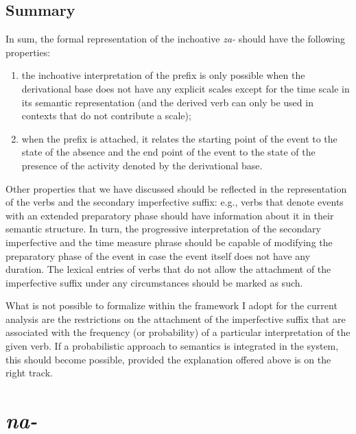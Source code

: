 \subsection{Summary}
In sum, the formal representation of the inchoative \textit{za-} should have the following properties: 
\begin{enumerate}
\item the inchoative interpretation of the prefix is only possible when the derivational base does not have any explicit scales except for the time scale in its semantic representation (and the derived verb can only be used in contexts that do not contribute a scale);
\item when the prefix is attached, it relates the starting point of the event to the state of the absence and the end point of the event to the state of the presence of the activity denoted by the derivational base.
\end{enumerate}

Other properties that we have discussed should be reflected in the representation of the verbs and the secondary imperfective suffix: e.g., verbs that denote events with an extended preparatory phase should have information about it in their semantic structure. In turn, the progressive interpretation of the secondary imperfective and the time measure phrase should be capable of modifying the preparatory phase of the event in case the event itself does not have any duration. The lexical entries of verbs that do not allow the attachment of the imperfective suffix under any circumstances should be marked as such.

What is not possible to formalize within the framework I adopt for the current analysis are the restrictions on the attachment of the imperfective suffix that are associated with the frequency (or probability) of a particular interpretation of the given verb. If a probabilistic approach to semantics is integrated in the system, this should become possible, provided the explanation offered above is on the right track.

\section{\textit{na-}}\label{subsection:semantics:na}
